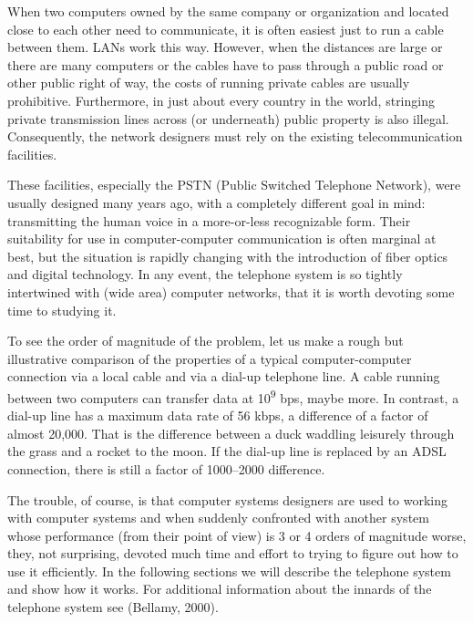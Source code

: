 \documentclass[b5paper,11pt]{memoir}
\begin{document}
When two computers owned by the same company or organization and located
close to each other need to communicate, it is often easiest just to run
a cable between them. LANs work this way. However, when the distances
are large or there are many computers or the cables have to pass through
a public road or other public right of way, the costs of running private
cables are usually prohibitive. Furthermore, in just about every country
in the world, stringing private transmission lines across (or
underneath) public property is also illegal. Consequently, the network
designers must rely on the existing telecommunication facilities.

These facilities, especially the {PSTN} ({Public Switched Telephone
Network}), were usually designed many years ago, with a completely
different goal in mind: transmitting the human voice in a more-or-less
recognizable form. Their suitability for use in computer-computer
communication is often marginal at best, but the situation is rapidly
changing with the introduction of fiber optics and digital technology.
In any event, the telephone system is so tightly intertwined with (wide
area) computer networks, that it is worth devoting some time to studying
it.

To see the order of magnitude of the problem, let us make a rough but
illustrative comparison of the properties of a typical computer-computer
connection via a local cable and via a dial-up telephone line. A cable
running between two computers can transfer data at 10\textsuperscript{9}
bps, maybe more. In contrast, a dial-up line has a maximum data rate of
56 kbps, a difference of a factor of almost 20,000. That is the
difference between a duck waddling leisurely through the grass and a
rocket to the moon. If the dial-up line is replaced by an ADSL
connection, there is still a factor of 1000--2000 difference.

The trouble, of course, is that computer systems designers are used to
working with computer systems and when suddenly confronted with another
system whose performance (from their point of view) is 3 or 4 orders of
magnitude worse, they, not surprising, devoted much time and effort to
trying to figure out how to use it efficiently. In the following
sections we will describe the telephone system and show how it works.
For additional information about the innards of the telephone system see
(Bellamy, 2000).

\protect\hypertarget{0130661023_ch02lev1sec5.htmlux5cux23ch02lev2sec17}{}{}
\end{document}
